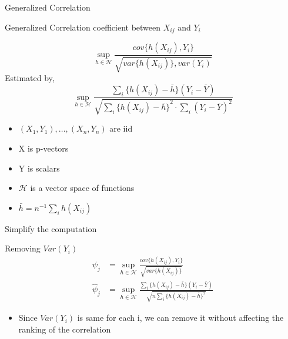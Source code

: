 \documentclass[ignorenonframetext,]{beamer}
\providecommand{\tightlist}{%
  \setlength{\itemsep}{0pt}\setlength{\parskip}{0pt}}
\begin{document}
\begin{frame}{Generalized Correlation}

\begin{block}{Generalized Correlation coefficient between $X_{ij}$ and $Y_i$}

\[
  \sup\limits_{h \in \mathcal{H}} \frac{cov\{h(X_{ij}), Y_i\}}{\sqrt{var\{h(X_{ij})\}, var(Y_i)}}
\]
Estimated by,
\[
\sup\limits_{h \in \mathcal{H}} \frac{\sum_i\{h(X_{ij}) - \bar{h}\}(Y_i - \bar{Y})}{\sqrt{\sum_i {\{h(X_{ij})-\bar{h}\}}^2 \cdot \sum_i {(Y_i - \bar{Y})}^2}}
\]
\end{block}

\begin{itemize}
\tightlist
\item
  \((X_1, Y_1), \dots, (X_n, Y_n)\) are iid
\item
  X is p-vectors
\item
  Y is scalars
\item
  \(\mathcal{H}\) is a vector space of functions
\item
  \(\bar{h} = n^{-1}\sum_ih(X_{ij})\)
\end{itemize}

\end{frame}

\begin{frame}{Simplify the computation}

\begin{block}{Removing $Var(Y_i)$}
    \begin{align*} 
      \psi_j &= \sup\limits_{h \in \mathcal{H}} \frac{cov\{h(X_{ij}), Y_i\}}{\sqrt{var\{h(X_{ij})\}}} \\   
      \hat{\psi}_j &= \sup\limits_{h \in \mathcal{H}} \frac{\sum_i\{h(X_{ij}) - \bar{h}\}(Y_i - \bar{Y})}{\sqrt{n\sum_i \{h(X_{ij})-\bar{h}\}^2}}
    \end{align*} 
\end{block}

\begin{itemize}
\tightlist
\item
  Since \(Var(Y_i)\) is same for each i, we can remove it without
  affecting the ranking of the correlation
\end{itemize}

\end{frame}
\end{document}
